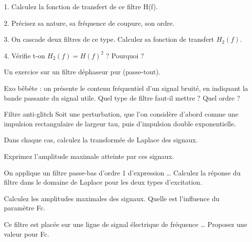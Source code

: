 	1. Calculez la fonction de transfert de ce filtre H(f).
	
	2. Précisez sa nature, sa fréquence de coupure, son ordre.
	
	3. On cascade deux filtres de ce type. Calculez sa fonction de transfert $H_{2}(f)$.
	
	4. Vérifie t-on $H_{2}(f)=H(f)^{2}$ ? Pourquoi ?
	
	\vspace{1\baselineskip}
	
	
	
	
	Un exercice sur un filtre déphaseur pur (passe-tout). 
	
	
	Exo bêbête : on présente le contenu fréquentiel d'un signal bruité, en indiquant la bande passante du signal utile. Quel type de filtre faut-il mettre ? Quel ordre ?
	
	Filtre anti-glitch
	Soit une perturbation, que l'on considère d'abord comme une impulsion rectangulaire de largeur tau, puis d'impulsion double exponentielle.
	
	Dans chaque cas, calculez la transformée de Laplace des signaux.
	
	Exprimez l'amplitude maximale atteinte par ces signaux.
	
	On applique un filtre passe-bas d'ordre 1 d'expression … Calculez la réponse du filtre dans le domaine de Laplace pour les deux types d'excitation.
	
	Calculez les amplitudes maximales des signaux. Quelle est l'influence du paramètre Fc.
	
	Ce filtre est placée sur une ligne de signal électrique de fréquence … Proposez une valeur pour Fc.
